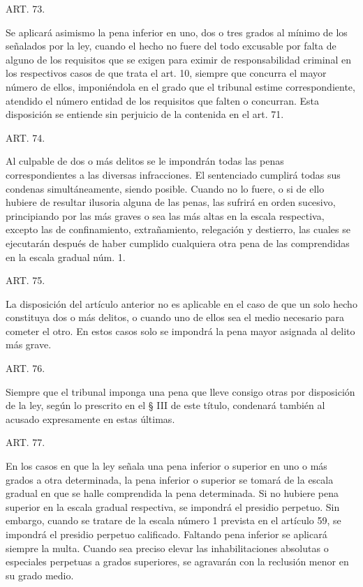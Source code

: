     ART. 73.

    Se aplicará asimismo la pena inferior en uno, dos o tres grados al mínimo de los señalados por la ley, cuando el hecho no fuere del todo excusable por falta de alguno de los requisitos que se exigen para eximir de responsabilidad criminal en los respectivos casos de que trata el art. 10, siempre que concurra el mayor número de ellos, imponiéndola en el grado que el tribunal estime correspondiente, atendido el número entidad de los requisitos que falten o concurran.
    Esta disposición se entiende sin perjuicio de la contenida en el art. 71.


    ART. 74.

    Al culpable de dos o más delitos se le impondrán todas las penas correspondientes a las diversas infracciones.
    El sentenciado cumplirá todas sus condenas simultáneamente, siendo posible. Cuando no lo fuere, o si de ello hubiere de resultar ilusoria alguna de las penas, las sufrirá en orden sucesivo, principiando por las más graves o sea las más altas en la escala respectiva, excepto las de confinamiento, extrañamiento, relegación y destierro, las cuales se ejecutarán después de haber cumplido cualquiera otra pena de las comprendidas en la escala gradual núm. 1.



    ART. 75.

    La disposición del artículo anterior no es aplicable en el caso de que un solo hecho constituya dos o más delitos, o cuando uno de ellos sea el medio necesario para cometer el otro.
    En estos casos solo se impondrá la pena mayor asignada al delito más grave.




    ART. 76.

    Siempre que el tribunal imponga una pena que lleve consigo otras por disposición de la ley, según lo prescrito en el § III de este título, condenará también al acusado expresamente en estas últimas.



    ART. 77.

    En los casos en que la ley señala una pena inferior o superior en uno o más grados a otra determinada, la pena inferior o superior se tomará de la escala gradual en que se halle comprendida la pena determinada.
    Si no hubiere pena superior en la escala gradual respectiva, se impondrá el presidio perpetuo. Sin embargo, cuando se tratare de la escala número 1 prevista en el artículo 59, se impondrá el presidio perpetuo calificado.
    Faltando pena inferior se aplicará siempre la multa.
    Cuando sea preciso elevar las inhabilitaciones absolutas o especiales perpetuas a grados superiores, se agravarán con la reclusión menor en su grado medio.   




